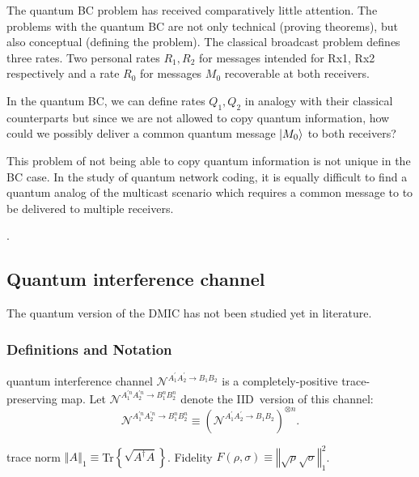 \documentclass[aps,11pt,twoside,letterpaper]{article}
\begin{document}
		The quantum BC problem has received comparatively little attention.
		The problems with the quantum BC are not only technical (proving theorems), 
		but also conceptual (defining the problem).
		The classical broadcast problem defines three rates. 
		Two personal rates  $R_1,R_2$ for messages intended for Rx1, Rx2 respectively
		and a rate $R_0$ for messages $M_0$ recoverable at both receivers.

		In the quantum BC, we can define rates $Q_1,Q_2$ in analogy with their
		classical counterparts but since we are not allowed to copy quantum information,
		how could we possibly deliver a common quantum message $| M_0 \rangle$ to both receivers?
		
		This problem of not being able to copy quantum information is not
		unique in the BC case. 
		In the study of quantum network coding, it is equally difficult to find a 
		quantum analog of the multicast scenario which requires a common message
		to to be delivered to multiple receivers.
		
		
		
		\cite{YHD2006}
		
		\cite{DH2006}.

		


	
	\subsection{Quantum interference channel}


		The quantum version of the DMIC has not been studied yet in literature. 


		\subsubsection{Definitions and Notation}

		quantum interference channel $\mathcal{N}^{A_{1}^{\prime}A_{2}^{\prime
		}\rightarrow B_{1}B_{2}}$ is a completely-positive trace-preserving map. Let
		$\mathcal{N}^{A_{1}^{\prime n}A_{2}^{\prime n}\rightarrow B_{1}^{n}B_{2}^{n}}$
		denote the IID\ version of this channel:%
		\[
		\mathcal{N}^{A_{1}^{\prime n}A_{2}^{\prime n}\rightarrow B_{1}^{n}B_{2}^{n}%
		}\equiv(\mathcal{N}^{A_{1}^{\prime}A_{2}^{\prime}\rightarrow B_{1}B_{2}%
		})^{\otimes n}.
		\]

		
		trace norm $\left\Vert A\right\Vert _{1}\equiv$Tr$\left\{  \sqrt{A^{\dag}%
		A}\right\}  $. Fidelity $F\left(  \rho,\sigma\right)  \equiv\left\Vert
		\sqrt{\rho}\sqrt{\sigma}\right\Vert _{1}^{2}$.
\end{document}
